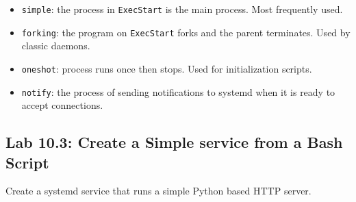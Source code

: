 \begin{itemize}
\item \texttt{simple}: the process in \texttt{ExecStart} is the main process. Most frequently used.
\item \texttt{forking}: the program on \texttt{ExecStart} forks and the parent terminates. Used by classic daemons.
\item \texttt{oneshot}: process runs once then stops. Used for initialization scripts.
\item \texttt{notify}: the process of sending notifications to systemd when it is ready to accept connections.
\end{itemize}

\subsection*{Lab 10.3: Create a Simple service from a Bash Script}

Create a systemd service that runs a simple Python based HTTP server.

